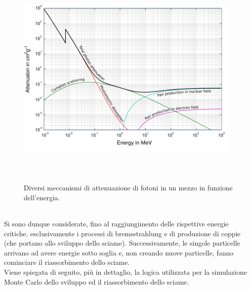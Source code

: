 \documentclass[10pt,a4paper,usenatbib]{article}
\begin{document}
 \begin{figure} [h!]
\centering
\includegraphics[width=11cm, height=11cm, keepaspectratio]{AttenuazioneFotoni}
\caption{Diversi meccanismi di attenuazione di fotoni in un mezzo in funzione dell'energia. }
\label{jpg:AttenuazioneFotoni}
\end{figure}
\\Si sono dunque considerate, fino al raggiungimento delle rispettive energie critiche, esclusivamente i processi di bremsstrahlung e di produzione di coppie (che portano allo sviluppo dello sciame). Successivamente, le singole particelle arrivano ad avere energie sotto soglia e, non creando nuove particelle, fanno cominciare il riassorbimento dello sciame. 
\\Viene spiegata di seguito, più in dettaglio, la logica utilizzata per la simulazione Monte Carlo dello sviluppo ed il riassorbimento dello sciame. 
\end{document}
